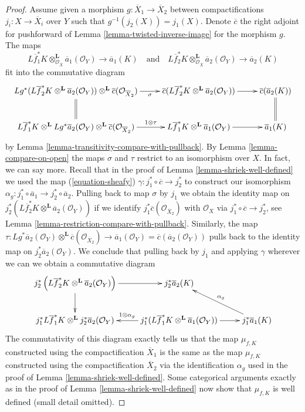 \documentclass{stacks-project}
\theoremstyle{plain}
\theoremstyle{definition}
\theoremstyle{remark}
\numberwithin{equation}{subsection}
\begin{document}
\begin{proof}
\medskip\noindent
Assume given a morphism $g : \overline{X}_1 \to \overline{X}_2$
between compactifications $j_i : X \to \overline{X}_i$ over $Y$
such that $g^{-1}(j_2(X)) = j_1(X)$. Denote $\overline{c}$ the
right adjoint for pushforward of Lemma \ref{lemma-twisted-inverse-image}
for the morphism $g$. The maps
$$
L\overline{f}_1^*K \otimes_{\mathcal{O}_{\overline{X}}}^\mathbf{L}
\overline{a}_1(\mathcal{O}_Y)
\longrightarrow
\overline{a}_1(K)
\quad\text{and}\quad
L\overline{f}_2^*K \otimes_{\mathcal{O}_{\overline{X}}}^\mathbf{L}
\overline{a}_2(\mathcal{O}_Y)
\longrightarrow
\overline{a}_2(K)
$$
fit into the commutative diagram
$$
\xymatrix{
Lg^*(L\overline{f}_2^*K \otimes^\mathbf{L}
\overline{a}_2(\mathcal{O}_Y))
\otimes^\mathbf{L} \overline{c}(\mathcal{O}_{\overline{X}_2})
\ar@{=}[d] \ar[r]_-\sigma &
\overline{c}(L\overline{f}_2^*K \otimes^\mathbf{L}
\overline{a}_2(\mathcal{O}_Y)) \ar[r] &
\overline{c}(\overline{a}_2(K)) \ar@{=}[d] \\
L\overline{f}_1^*K \otimes^\mathbf{L} Lg^*\overline{a}_2(\mathcal{O}_Y)
\otimes^\mathbf{L} \overline{c}(\mathcal{O}_{\overline{X}_2})
\ar[r]^-{1 \otimes \tau} &
L\overline{f}_1^*K \otimes^\mathbf{L} \overline{a}_1(\mathcal{O}_Y) \ar[r] &
\overline{a}_1(K)
}
$$
by Lemma \ref{lemma-transitivity-compare-with-pullback}. By
Lemma \ref{lemma-compare-on-open} the maps $\sigma$ and $\tau$
restrict to an isomorphism over $X$. In fact, we can say more.
Recall that in the proof of Lemma \ref{lemma-shriek-well-defined} we used
the map (\ref{equation-sheafy}) $\gamma : j_1^* \circ \overline{c} \to j_2^*$
to construct our isomorphism
$\alpha_g : j_1^* \circ \overline{a}_1 \to j_2^* \circ \overline{a}_2$.
Pulling back to map $\sigma$ by $j_1$ we obtain the identity
map on $j_2^*\left(L\overline{f}_2^*K \otimes^\mathbf{L}
\overline{a}_2(\mathcal{O}_Y)\right)$ if we identify
$j_1^*\overline{c}(\mathcal{O}_{\overline{X}_2})$
with $\mathcal{O}_X$ via $j_1^* \circ \overline{c} \to j_2^*$, see
Lemma \ref{lemma-restriction-compare-with-pullback}.
Similarly, the map $\tau : Lg^*\overline{a}_2(\mathcal{O}_Y)
\otimes^\mathbf{L} \overline{c}(\mathcal{O}_{\overline{X}_2}) \to
\overline{a}_1(\mathcal{O}_Y) = \overline{c}(\overline{a}_2(\mathcal{O}_Y))$
pulls back to the identity map on $j_2^*\overline{a}_2(\mathcal{O}_Y)$.
We conclude that pulling back by $j_1$ and applying $\gamma$ wherever
we can we obtain a commutative diagram
$$
\xymatrix{
j_2^*\left(L\overline{f}_2^*K \otimes^\mathbf{L}
\overline{a}_2(\mathcal{O}_Y)\right) \ar[r] \ar[d] &
j_2^*\overline{a}_2(K) \\
j_1^*L\overline{f}_1^*K \otimes^\mathbf{L} j_2^*\overline{a}_2(\mathcal{O}_Y) &
j_1^*(L\overline{f}_1^*K \otimes^\mathbf{L} \overline{a}_1(\mathcal{O}_Y))
\ar[r] \ar[l]_{1 \otimes \alpha_g} &
j_1^* \overline{a}_1(K) \ar[lu]_{\alpha_g}
}
$$
The commutativity of this diagram exactly tells us that the map
$\mu_{f, K}$ constructed using the compactification $\overline{X}_1$
is the same as the map $\mu_{f, K}$ constructed using the compactification
$\overline{X}_2$ via the identification $\alpha_g$ used in the proof
of Lemma \ref{lemma-shriek-well-defined}. Some categorical arguments
exactly as in the proof of  Lemma \ref{lemma-shriek-well-defined}
now show that $\mu_{f, K}$ is well defined (small detail omitted).


\end{proof}
\end{document}
